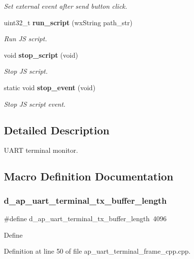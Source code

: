 \begin{DoxyCompactItemize}
\begin{DoxyCompactList}\small\item\em Set external event after send button click. \end{DoxyCompactList}\item 
uint32\+\_\+t \textbf{ run\+\_\+script} (wx\+String path\+\_\+str)
\begin{DoxyCompactList}\small\item\em Run JS script. \end{DoxyCompactList}\item 
void \textbf{ stop\+\_\+script} (void)
\begin{DoxyCompactList}\small\item\em Stop JS script. \end{DoxyCompactList}\item 
static void \textbf{ stop\+\_\+event} (void)
\begin{DoxyCompactList}\small\item\em Stop JS script event. \end{DoxyCompactList}\end{DoxyCompactItemize}


\subsection{Detailed Description}
U\+A\+RT terminal monitor. 



\subsection{Macro Definition Documentation}
\mbox{\label{group___u_a_r_t__terminal_ga92e1b0371578874fa2691079da8edc27}} 
\subsubsection{d\_ap\_uart\_terminal\_tx\_buffer\_length}
{\footnotesize\ttfamily \#define d\+\_\+ap\+\_\+uart\+\_\+terminal\+\_\+tx\+\_\+buffer\+\_\+length~4096}

Define 

Definition at line 50 of file ap\+\_\+uart\+\_\+terminal\+\_\+frame\+\_\+cpp.\+cpp.



